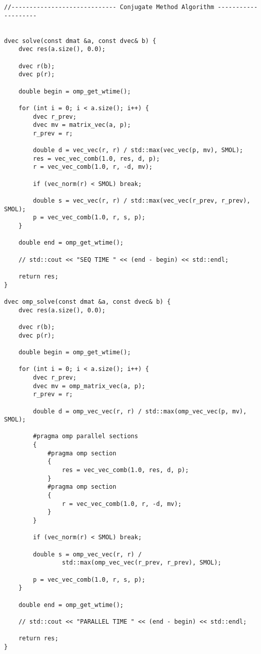 \documentclass[14pt, russian]{extarticle}
\begin{document}
\begin{lstlisting}
//----------------------------- Conjugate Method Algorithm --------------------


dvec solve(const dmat &a, const dvec& b) {
    dvec res(a.size(), 0.0);

    dvec r(b);
    dvec p(r);

    double begin = omp_get_wtime();

    for (int i = 0; i < a.size(); i++) {
        dvec r_prev;
        dvec mv = matrix_vec(a, p);
        r_prev = r;

        double d = vec_vec(r, r) / std::max(vec_vec(p, mv), SMOL);
        res = vec_vec_comb(1.0, res, d, p);
        r = vec_vec_comb(1.0, r, -d, mv);

        if (vec_norm(r) < SMOL) break;

        double s = vec_vec(r, r) / std::max(vec_vec(r_prev, r_prev), SMOL);
        p = vec_vec_comb(1.0, r, s, p);
    }

    double end = omp_get_wtime();

    // std::cout << "SEQ TIME " << (end - begin) << std::endl;

    return res;
}

dvec omp_solve(const dmat &a, const dvec& b) {
    dvec res(a.size(), 0.0);

    dvec r(b);
    dvec p(r);

    double begin = omp_get_wtime();

    for (int i = 0; i < a.size(); i++) {
        dvec r_prev;
        dvec mv = omp_matrix_vec(a, p);
        r_prev = r;

        double d = omp_vec_vec(r, r) / std::max(omp_vec_vec(p, mv), SMOL);

        #pragma omp parallel sections
        {
            #pragma omp section
            {
                res = vec_vec_comb(1.0, res, d, p);
            }
            #pragma omp section
            {
                r = vec_vec_comb(1.0, r, -d, mv);
            }
        }

        if (vec_norm(r) < SMOL) break;

        double s = omp_vec_vec(r, r) /
                std::max(omp_vec_vec(r_prev, r_prev), SMOL);

        p = vec_vec_comb(1.0, r, s, p);
    }

    double end = omp_get_wtime();

    // std::cout << "PARALLEL TIME " << (end - begin) << std::endl;

    return res;
}
        \end{lstlisting}
\end{document}
